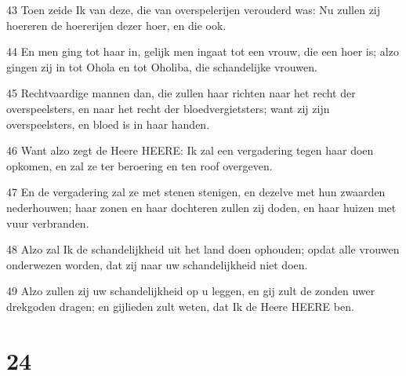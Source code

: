 \par 43 Toen zeide Ik van deze, die van overspelerijen verouderd was: Nu zullen zij hoereren de hoererijen dezer hoer, en die ook.
\par 44 En men ging tot haar in, gelijk men ingaat tot een vrouw, die een hoer is; alzo gingen zij in tot Ohola en tot Oholiba, die schandelijke vrouwen.
\par 45 Rechtvaardige mannen dan, die zullen haar richten naar het recht der overspeelsters, en naar het recht der bloedvergietsters; want zij zijn overspeelsters, en bloed is in haar handen.
\par 46 Want alzo zegt de Heere HEERE: Ik zal een vergadering tegen haar doen opkomen, en zal ze ter beroering en ten roof overgeven.
\par 47 En de vergadering zal ze met stenen stenigen, en dezelve met hun zwaarden nederhouwen; haar zonen en haar dochteren zullen zij doden, en haar huizen met vuur verbranden.
\par 48 Alzo zal Ik de schandelijkheid uit het land doen ophouden; opdat alle vrouwen onderwezen worden, dat zij naar uw schandelijkheid niet doen.
\par 49 Alzo zullen zij uw schandelijkheid op u leggen, en gij zult de zonden uwer drekgoden dragen; en gijlieden zult weten, dat Ik de Heere HEERE ben.

\chapter{24}

